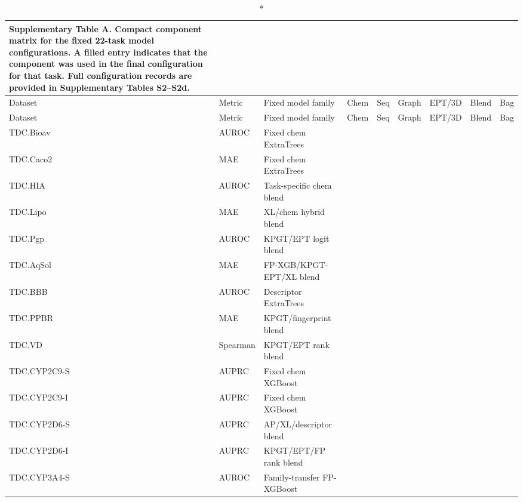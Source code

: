 \documentclass[10pt]{article}
\newcommand{\used}{\textcolor{suppblue}{\textbullet}}
\begin{document}
{\footnotesize
\renewcommand{\arraystretch}{1.08}
\setlength{\tabcolsep}{3.4pt}
\begin{longtable}{p{2.45cm} p{1.55cm} p{4.15cm} c c c c c c}
\caption*{\textbf{Supplementary Table A.} Compact component matrix for the fixed 22-task model configurations. A filled entry indicates that the component was used in the final configuration for that task. Full configuration records are provided in Supplementary Tables S2--S2d.}\\
\toprule
\rowcolor{suppbluepale}
Dataset & Metric & Fixed model family & Chem & Seq & Graph & EPT/3D & Blend & Bag \\
\midrule
\endfirsthead
\toprule
\rowcolor{suppbluepale}
Dataset & Metric & Fixed model family & Chem & Seq & Graph & EPT/3D & Blend & Bag \\
\midrule
\endhead
TDC.Bioav & AUROC & Fixed chem ExtraTrees & \used &  & \used &  &  & \used \\
TDC.Caco2 & MAE & Fixed chem ExtraTrees & \used & \used & \used &  &  & \used \\
TDC.HIA & AUROC & Task-specific chem blend & \used &  &  &  & \used & \used \\
TDC.Lipo & MAE & XL/chem hybrid blend & \used & \used & \used & \used & \used & \used \\
TDC.Pgp & AUROC & KPGT/EPT logit blend &  & \used & \used & \used & \used &  \\
TDC.AqSol & MAE & FP-XGB/KPGT-EPT/XL blend & \used & \used & \used & \used & \used &  \\
TDC.BBB & AUROC & Descriptor ExtraTrees & \used &  &  &  &  &  \\
TDC.PPBR & MAE & KPGT/fingerprint blend & \used &  & \used &  & \used & \used \\
TDC.VD & Spearman & KPGT/EPT rank blend & \used &  & \used & \used & \used & \used \\
TDC.CYP2C9-S & AUPRC & Fixed chem XGBoost & \used & \used & \used & \used &  & \used \\
TDC.CYP2C9-I & AUPRC & Fixed chem XGBoost & \used &  & \used & \used &  & \used \\
TDC.CYP2D6-S & AUPRC & AP/XL/descriptor blend & \used & \used &  & \used & \used & \used \\
TDC.CYP2D6-I & AUPRC & KPGT/EPT/FP rank blend & \used &  & \used & \used & \used & \used \\
TDC.CYP3A4-S & AUROC & Family-transfer FP-XGBoost & \used &  &  &  &  &  \\

\end{longtable}}
\end{document}
